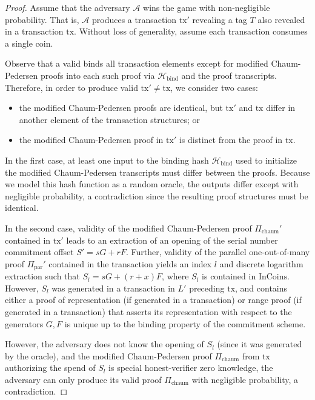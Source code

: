 \documentclass{llncs}
\newcommand{\hash}{\mathcal{H}}
\begin{document}
\begin{proof}
Assume that the adversary $\mathcal{A}$ wins the game with non-negligible probability.
That is, $\mathcal{A}$ produces a transaction $\text{tx}'$ revealing a tag $T$ also revealed in a transaction $\text{tx}$.
Without loss of generality, assume each transaction consumes a single coin.

Observe that a valid  binds all transaction elements except for modified Chaum-Pedersen proofs into each such proof via $\hash_{\text{bind}}$ and the proof transcripts.
Therefore, in order to produce valid $\text{tx}' \neq \text{tx}$, we consider two cases:
\begin{itemize}
    \item the modified Chaum-Pedersen proofs are identical, but $\text{tx}'$ and $\text{tx}$ differ in another element of the transaction structures; or
    \item the modified Chaum-Pedersen proof in $\text{tx}'$ is distinct from the proof in $\text{tx}$.
\end{itemize}

In the first case, at least one input to the binding hash $\hash_{\text{bind}}$ used to initialize the modified Chaum-Pedersen transcripts must differ between the proofs.
Because we model this hash function as a random oracle, the outputs differ except with negligible probability, a contradiction since the resulting proof structures must be identical.

In the second case, validity of the modified Chaum-Pedersen proof $\Pi_{\text{chaum}}'$ contained in $\text{tx}'$ leads to an extraction of an opening of the serial number commitment offset $S' = sG + rF$.
Further, validity of the parallel one-out-of-many proof $\Pi_{\text{par}}'$ contained in the transaction yields an index $l$ and discrete logarithm extraction such that $S_l = sG + (r + x)F$, where $S_l$ is contained in $\text{InCoins}$.
However, $S_l$ was generated in a transaction in $L'$ preceding $\text{tx}$, and contains either a proof of representation (if generated in a  transaction) or range proof (if generated in a  transaction) that asserts its representation with respect to the generators $G,F$ is unique up to the binding property of the commitment scheme.

However, the adversary does not know the opening of $S_l$ (since it was generated by the oracle), and the modified Chaum-Pedersen proof $\Pi_{\text{chaum}}$ from $\text{tx}$ authorizing the spend of $S_l$ is special honest-verifier zero knowledge, the adversary can only produce its valid proof $\Pi_{\text{chaum}}$ with negligible probability, a contradiction.
\end{proof}
\end{document}
